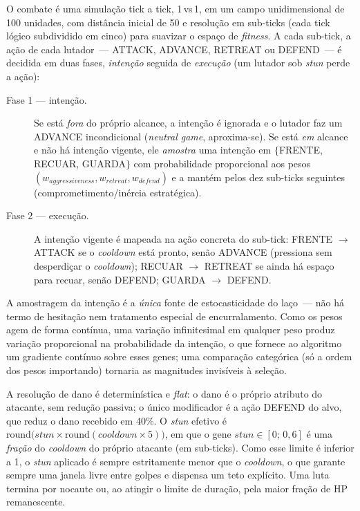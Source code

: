 \documentclass[12pt]{article}
\begin{document}
O combate é uma simulação tick a tick, 1\,vs\,1, em um campo unidimensional de 100
unidades, com distância inicial de 50 e resolução em sub-ticks (cada tick lógico
subdividido em cinco) para suavizar o espaço de \emph{fitness}. A cada
sub-tick, a ação de cada lutador~--- ATTACK, ADVANCE, RETREAT ou DEFEND~--- é
decidida em duas fases, \emph{intenção} seguida de \emph{execução} (um lutador sob
\emph{stun} perde a ação):

\begin{description}
\item[Fase 1 --- intenção.] Se está \emph{fora} do próprio alcance, a intenção é
ignorada e o lutador faz um ADVANCE incondicional (\emph{neutral game}, aproxima-se).
Se está \emph{em} alcance e não há intenção vigente, ele \emph{amostra} uma intenção
em $\{$FRENTE, RECUAR, GUARDA$\}$ com probabilidade proporcional aos pesos
$(w_{aggressiveness}, w_{retreat}, w_{defend})$ e a mantém pelos dez sub-ticks
seguintes (comprometimento/inércia estratégica).
\item[Fase 2 --- execução.] A intenção vigente é mapeada na ação concreta do
sub-tick: FRENTE $\rightarrow$ ATTACK se o \emph{cooldown} está pronto, senão
ADVANCE (pressiona sem desperdiçar o \emph{cooldown}); RECUAR $\rightarrow$ RETREAT
se ainda há espaço para recuar, senão DEFEND; GUARDA $\rightarrow$ DEFEND.
\end{description}

A amostragem da intenção é a \emph{única} fonte de estocasticidade do laço~--- não
há termo de hesitação nem tratamento especial de encurralamento. Como os pesos
agem de forma contínua, uma variação infinitesimal em qualquer peso produz
variação proporcional na probabilidade da intenção, o que fornece ao algoritmo um
gradiente contínuo sobre esses genes; uma comparação categórica (só a ordem dos
pesos importando) tornaria as magnitudes invisíveis à seleção.

A resolução de dano é determinística e \emph{flat}: o dano é o próprio atributo do
atacante, sem redução passiva; o único modificador é a ação DEFEND do alvo, que
reduz o dano recebido em 40\%. O \emph{stun} efetivo é
$\mathrm{round}\!\big(\textit{stun}\times\mathrm{round}(\textit{cooldown}\times5)\big)$,
em que o gene $\textit{stun}\in[0;\,0{,}6]$ é uma \emph{fração} do \emph{cooldown}
do próprio atacante (em sub-ticks). Como esse limite é inferior a 1, o \emph{stun}
aplicado é sempre estritamente menor que o \emph{cooldown}, o que garante sempre
uma janela livre entre golpes e dispensa um teto explícito. Uma luta termina por
nocaute ou, ao atingir o limite de duração, pela maior fração de HP remanescente.
\end{document}

